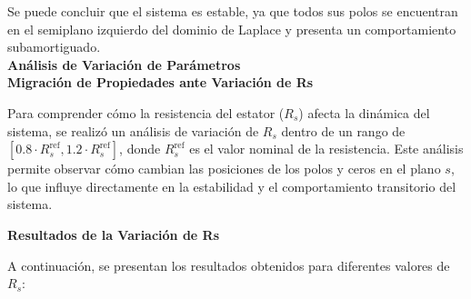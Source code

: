 \documentclass{article}
\begin{document}
Se puede concluir que el sistema es estable, ya que todos sus polos se encuentran en el semiplano izquierdo del dominio de Laplace y presenta un comportamiento subamortiguado.\\


\textbf{Análisis de Variación de Parámetros}\\
\textbf{Migración de Propiedades ante Variación de Rs}

Para comprender cómo la resistencia del estator (\( R_s \)) afecta la dinámica del sistema, se realizó un análisis de variación de \( R_s \) dentro de un rango de \([0.8 \cdot R_s^{\text{ref}}, 1.2 \cdot R_s^{\text{ref}}]\), donde \( R_s^{\text{ref}} \) es el valor nominal de la resistencia. Este análisis permite observar cómo cambian las posiciones de los polos y ceros en el plano \( s \), lo que influye directamente en la estabilidad y el comportamiento transitorio del sistema.

\textbf{Resultados de la Variación de Rs}

A continuación, se presentan los resultados obtenidos para diferentes valores de \( R_s \):
\end{document}
